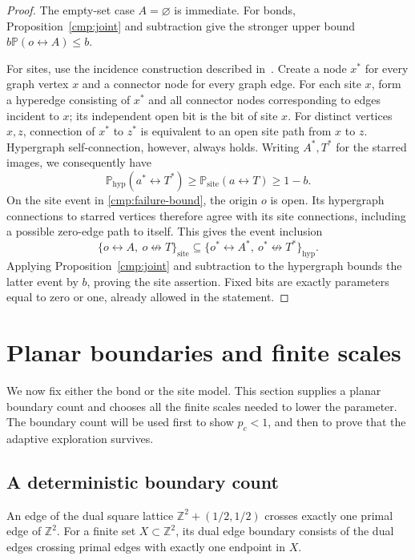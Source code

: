 \documentclass[11pt]{article}
\theoremstyle{definition}
\theoremstyle{remark}
\numberwithin{equation}{section}
\begin{document}
\begin{proof}
The empty-set case $A=\varnothing$ is immediate. For bonds,
Proposition~\ref{cmp:joint} and subtraction give the stronger upper bound
$b\mathbb P(o\leftrightarrow A)\le b$.

For sites, use the incidence construction described
in~\cite[``One inequality for both models'']{SitePublic2026}.
Create a node $x^*$ for every graph vertex $x$ and a connector node for every
graph edge. For each site $x$, form a hyperedge consisting
of $x^*$ and all connector nodes corresponding to edges incident to $x$;
its independent open bit is the bit of site $x$. For distinct vertices
$x,z$, connection of $x^*$ to $z^*$ is equivalent to an open site path
from $x$ to $z$. Hypergraph self-connection, however, always holds.
Writing $A^*,T^*$ for the starred images, we consequently have
\[
 \mathbb P_{\mathrm{hyp}}(a^*\leftrightarrow T^*)
 \ge\mathbb P_{\mathrm{site}}(a\leftrightarrow T)\ge1-b.
\]
On the site event in \eqref{cmp:failure-bound}, the origin $o$ is open.
Its hypergraph connections to starred vertices therefore agree with its
site connections, including a possible zero-edge path to itself. This gives
the event inclusion
\[
 \{o\leftrightarrow A,\ o\not\leftrightarrow T\}_{\mathrm{site}}
 \subseteq
 \{o^*\leftrightarrow A^*,\ o^*\not\leftrightarrow T^*\}_{\mathrm{hyp}}.
\]
Applying Proposition~\ref{cmp:joint} and subtraction to the hypergraph bounds
the latter event by $b$, proving the site assertion. Fixed bits are exactly
parameters equal to zero or one, already allowed in the statement.
\end{proof}

\section{Planar boundaries and finite scales}\label{sec:preliminaries}

We now fix either the bond or the site model. This section supplies a planar
boundary count and chooses all the finite scales needed to lower the parameter.
The boundary count will be used first to show $p_c<1$, and then to prove that
the adaptive exploration survives.

\subsection{A deterministic boundary count}

An edge of the dual square lattice
$\mathbb Z^2+(1/2,1/2)$ crosses exactly one primal edge of $\mathbb Z^2$.
For a finite set $X\subset\mathbb Z^2$, its dual edge boundary consists of
the dual edges crossing primal edges with exactly one endpoint in $X$.
\end{document}
